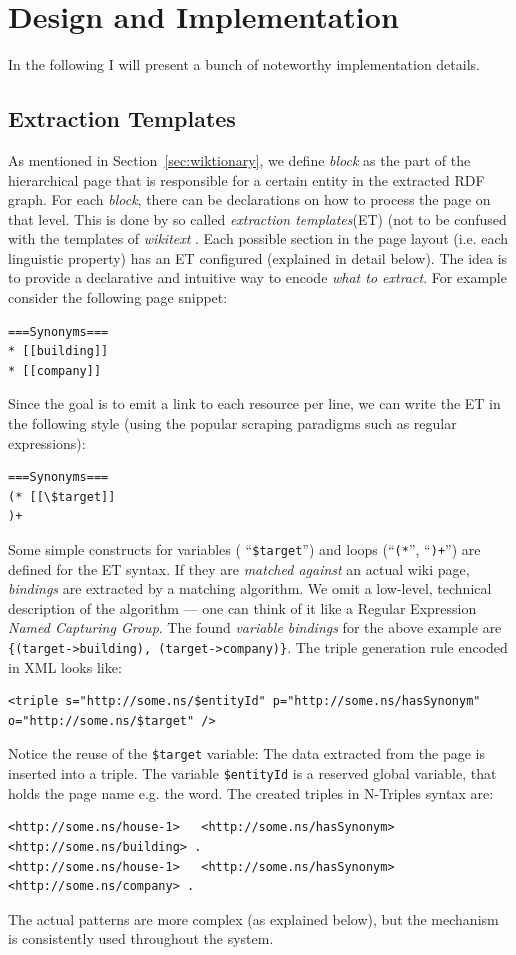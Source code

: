 \section{Design and Implementation}
\label{sec:implementation}
In the following I will present a bunch of noteworthy implementation details.

\subsection{Extraction Templates}
As mentioned in Section~\ref{sec:wiktionary}, we define \textit{block} as the part of the hierarchical page that is responsible for a certain entity in the extracted RDF graph. 
For each \textit{block}, there can be declarations on how to process the page on that level.
This is done by so called \textit{extraction templates}(ET) (not to be confused with the templates of \textit{wikitext} .
Each possible section in the \wik page layout (i.e. each linguistic property) has an ET configured (explained in detail below). 
The idea is to provide a declarative and intuitive way to encode \textit{what to extract}.
For example consider the following page snippet:
\begin{lstlisting}
===Synonyms===
* [[building]]
* [[company]]
\end{lstlisting}
Since the goal is to emit a link to each resource per line, we can write the ET in the following style (using the popular scraping paradigms such as regular expressions):
\begin{lstlisting}
===Synonyms===
(* [[\$target]]
)+
\end{lstlisting}
Some simple constructs for variables ( ``\texttt{\$target}'') and loops (``\texttt{(*}'', ``\texttt{)+}'') are defined for the ET syntax.
If they are \textit{matched against} an actual wiki page, \textit{bindings} are extracted by a matching algorithm.
We omit a low-level, technical description of the algorithm --- one can think of it like a Regular Expression \textit{Named Capturing Group}.
The found \textit{variable bindings} for the above example are \texttt{\{(target->building), (target->company)\}}. 
The triple generation rule encoded in XML looks like:
\begin{lstlisting}[style=XML]
<triple s="http://some.ns/$entityId" p="http://some.ns/hasSynonym" o="http://some.ns/$target" />
\end{lstlisting}
Notice the reuse of the \texttt{\$target} variable:
The data extracted from the page is inserted into a triple.
The variable \texttt{\$entityId} is a reserved global variable, that holds the page name e.g. the word.
The created triples in N-Triples syntax are:
\begin{lstlisting}[style=N3]
<http://some.ns/house-1>   <http://some.ns/hasSynonym>   <http://some.ns/building> .
<http://some.ns/house-1>   <http://some.ns/hasSynonym>   <http://some.ns/company> .
\end{lstlisting}
The actual patterns are more complex (as explained below), but the mechanism is consistently used throughout the system.

